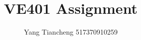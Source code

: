 \documentclass[12pt,a4paper]{article}
\begin{document}
\title{VE401 Assignment}
\author{Yang Tiancheng 517370910259}
\maketitle

\newpage

 
\end{document}
